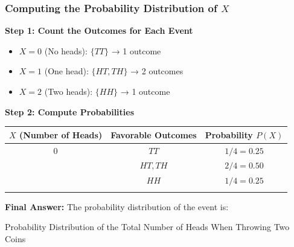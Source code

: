 \documentclass[handout]{beamer} %
\begin{document}
\begin{frame}
    \frametitle{Computing the Probability Distribution of \(X\)}

    \textbf{Step 1: Count the Outcomes for Each Event}
    \begin{itemize}
        \item \(X = 0\) (No heads): \( \{TT\} \) → 1 outcome \pause
        \item \(X = 1\) (One head): \( \{HT, TH\} \) → 2 outcomes \pause
        \item \(X = 2\) (Two heads): \( \{HH\} \) → 1 outcome
    \end{itemize}

    \textbf{Step 2: Compute Probabilities}
    \vspace{-2em}
    \begin{center}
        \begin{tabular}{c|c|c}
            \(X\) (Number of Heads) & Favorable Outcomes & Probability \( P(X) \) \\
            \hline
            0 & \( TT \) & \( 1/4 = 0.25 \) \\  \pause
            1 & \( HT, TH \) & \( 2/4  = 0.50 \) \\  \pause
            2 & \( HH \) & \( 1/4  = 0.25 \) \\  \pause
        \end{tabular}
    \end{center}

    \textbf{Final Answer:} The probability distribution of the event is:


\end{frame}

\begin{frame}{Probability Distribution of the Total Number of Heads When Throwing Two Coins}
\vspace{1em}
\centering
{}

\end{frame}
\end{document}
